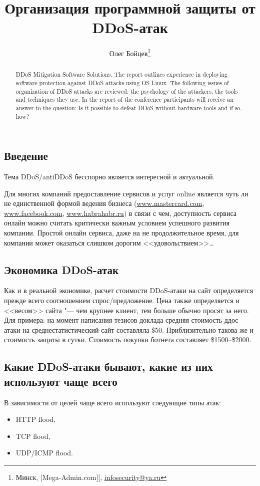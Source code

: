 \documentclass[10pt, a5paper]{article}
\begin{document}
\title{Организация программной защиты от DDoS-атак }

\author{Олег Бойцев\footnote{Минск, [Mega-Admin.com][, \url{infosecurity@ya.ru}}}
\maketitle

\begin{abstract}
DDoS Mitigation Software Solutions. The report outlines experience in deploying software protection against DDoS attacks using OS Linux. The following  issues of organization of DDoS attacks are reviewed: the psychology of the attackers, the tools and techniques they use. In the report of the conference participants will receive an answer to the question: Is it possible to defeat DDoS without hardware tools and if so, how?
\end{abstract}

\subsection*{Введение}
Тема DDoS/antiDDoS бесспорно является интересной и актуальной. 

Для многих компаний предоставление сервисов и услуг  online является чуть ли не единственной формой ведения бизнеса (\url{www.mastercard.com}, \url{www.facebook.com}, \url{www.habrahabr.ru}) в связи с чем, доступность сервиса онлайн можно считать критически важным условием успешного развития компании. Простой онлайн сервиса, даже на не продолжительное время, для компании может оказаться слишком дорогим <<удовольствием>>\ldots

\subsection*{Экономика DDoS-атак}
Как и в реальной экономике, расчет стоимости DDoS-атаки на сайт определяется прежде всего соотношением спрос/предложение. Цена также определяется и <<весом>> сайта "--- чем крупнее клиент, тем больше обычно просят за него.
Для примера: на момент написания тезисов доклада средняя стоимость ддос атаки на среднестатистический сайт составляла \$50. Приблизительно такова же и стоимость защиты в сутки. Стоимость покупки ботнета составляет \$1500--\$2000.

\subsection*{Какие DDoS-атаки бывают, какие из них используют чаще всего}
В зависимости от целей  чаще всего используют следующие типы атак:  
\begin{itemize}
\item HTTP flood,
\item TCP flood,
\item UDP/ICMP flood.
\end{itemize}
\end{document}
